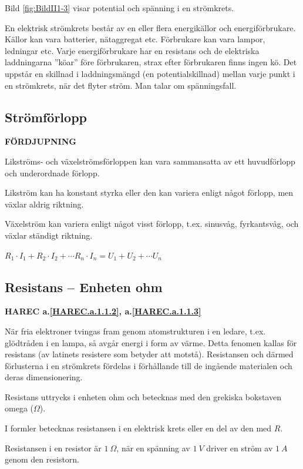 Bild \ref{fig:BildII1-3} visar potential och spänning i en strömkrets.

En elektrisk strömkrets består av en eller flera energikällor och
energiförbrukare.
Källor kan vara batterier, nätaggregat etc.
Förbrukare kan vara lampor, ledningar etc.
Varje energiförbrukare har en resistans och de elektriska laddningarna ''köar''
före förbrukaren, strax efter förbrukaren finns ingen kö.
Det uppstår en skillnad i laddningsmängd (en potentialskillnad) mellan varje
punkt i en strömkrets, när det flyter ström.
Man talar om spänningsfall.

\subsection{Strömförlopp}
\textbf{FÖRDJUPNING}

Likströms- och växelströmsförloppen kan vara sammansatta av ett huvudförlopp och
underordnade förlopp.

Likström kan ha konstant styrka eller den kan variera enligt något förlopp, men
växlar aldrig riktning.

Växelström kan variera enligt något visst förlopp, t.ex. sinusvåg,
fyrkantsvåg, och växlar ständigt riktning.

\(R_1 \cdot I_1 + R_2 \cdot I_2 + \cdots R_n \cdot I_n = U_1 + U_2 + \cdots U_n\)

\subsection{Resistans -- Enheten ohm}
\textbf{HAREC a.\ref{HAREC.a.1.1.2}\label{myHAREC.a.1.1.2c}, a.\ref{HAREC.a.1.1.3}\label{myHAREC.a.1.1.3c}}

När fria elektroner tvingas fram genom atomstrukturen i en ledare, t.ex.
glödtråden i en lampa, så avgår energi i form av värme.
Detta fenomen kallas för resistans (av latinets resistere som betyder att
motstå).
Resistansen och därmed förlusterna i en strömkrets fördelas i
förhållande till de ingående materialen och deras dimensionering.

Resistans uttrycks i enheten ohm och betecknas med den grekiska bokstaven
omega (\(\Omega\)).

I formler betecknas resistansen i en elektrisk krets eller en del av den med \(R\).

Resistansen i en resistor är \(1\ \Omega\), när en spänning av \(1\ V\)
driver en ström av \(1\ A\) genom den resistorn.

